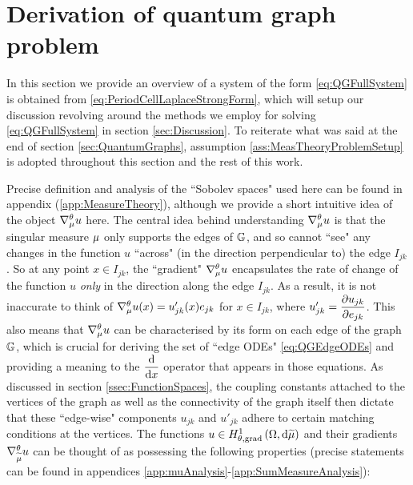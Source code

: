 \section{Derivation of quantum graph problem} \label{sec:SystemDerivation}
In this section we provide an overview of a system of the form \eqref{eq:QGFullSystem} is obtained from \eqref{eq:PeriodCellLaplaceStrongForm}, which will setup our discussion revolving around the methods we employ for solving \eqref{eq:QGFullSystem} in section \ref{sec:Discussion}.
To reiterate what was said at the end of section \ref{sec:QuantumGraphs}, assumption \ref{ass:MeasTheoryProblemSetup} is adopted throughout this section and the rest of this work. 

Precise definition and analysis of the ``Sobolev spaces" used here can be found in appendix (\ref{app:MeasureTheory}), although we provide a short intuitive idea of the object $\nabla^{\theta}_{\mu}u$ here.
The central idea behind understanding $\nabla^{\theta}_{\mu}u$ is that the singular measure $\mu$ only supports the edges of $\mathbb{G}$, and so cannot ``see" any changes in the function $u$ ``across" (in the direction perpendicular to) the edge $I_{jk}$.
So at any point $x\in I_{jk}$, the ``gradient" $\nabla^{\theta}_{\mu}u$ encapsulates the rate of change of the function $u$ \emph{only} in the direction along the edge $I_{jk}$.
As a result, it is not inaccurate to think of $\nabla^{\theta}_{\mu}u(x) = u_{jk}'(x)e_{jk}$ for $x\in I_{jk}$, where $u_{jk}' = \dfrac{\partial u_{jk}}{\partial e_{jk}}$.
This also means that $\nabla^{\theta}_{\mu}u$ can be characterised by its form on each edge of the graph $\mathbb{G}$, which is crucial for deriving the set of ``edge ODEs" \eqref{eq:QGEdgeODEs} and providing a meaning to the $\dfrac{\mathrm{d}}{\mathrm{d}x}$ operator that appears in those equations.
As discussed in section \ref{ssec:FunctionSpaces}, the coupling constants attached to the vertices of the graph as well as the connectivity of the graph itself then dictate that these ``edge-wise" components $u_{jk}$ and $u'_{jk}$ adhere to certain matching conditions at the vertices.
The functions $u\in H^1_{\theta, \mathrm{grad}}\left( \Omega, \mathrm{d}\widetilde{\mu} \right)$ and their gradients $\nabla^{\theta}_{\widetilde{\mu}}u$ can be thought of as possessing the following properties (precise statements can be found in appendices \ref{app:muAnalysis}-\ref{app:SumMeasureAnalysis}):
